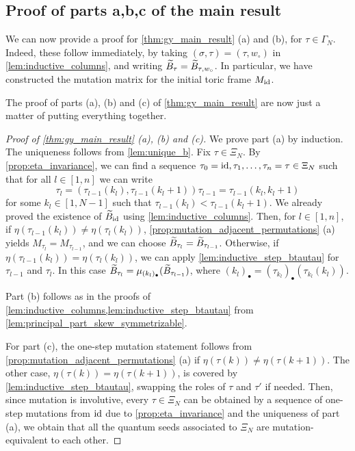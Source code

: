 \subsection{Proof of parts a,b,c of the main result}
We can now provide a proof for \cref{thm:gy_main_result} (a) and (b), for $\tau \in
	\Gamma_N$. Indeed, these follow immediately, by taking $(\sigma, \tau) = (\tau,
	w_\circ)$ in \cref{lem:inductive_columns}, and writing $\widetilde{B}_{\tau} = \widetilde{B}_{\tau,
		w_\circ}$. In particular, we have constructed the mutation matrix for the initial toric
frame $M_{\operatorname{id}}$.

The proof of parts (a), (b) and (c) of \cref{thm:gy_main_result} are now just a matter
of putting everything together.
\begin{proof}[Proof of \cref{thm:gy_main_result} (a), (b) and (c)]
	We prove part (a) by induction. The uniqueness follows from \cref{lem:unique_b}. Fix $\tau \in \Xi_N$. By \cref{prop:eta_invariance}, we can find a sequence $\tau_0 = \operatorname{id}, \tau_1, \dots, \tau_n = \tau \in \Xi_N$ such that for all $l \in [1, n]$ we can write
	\begin{equation*}
		\tau_l = (\tau_{l-1}(k_l), \tau_{l-1}(k_l + 1))\tau_{l-1} = \tau_{l-1}(k_l, k_l + 1)
	\end{equation*}
	for some $k_l \in [1, N-1]$ such that $\tau_{l-1}(k_l) < \tau_{l-1}(k_l + 1)$. We
	already proved the existence of $\widetilde{B}_{\operatorname{id}}$ using \cref{lem:inductive_columns}. Then,
	for $l \in [1, n]$, if $\eta(\tau_{l-1}(k_l)) \neq \eta(\tau_l(k_l))$,
	\cref{prop:mutation_adjacent_permutations} (a) yields $M_{\tau_l} = M_{\tau_{l-1}}$,
	and we can choose $\widetilde{B}_{\tau_l} = \widetilde{B}_{\tau_{l-1}}$. Otherwise, if
	$\eta(\tau_{l-1}(k_l)) = \eta(\tau_l(k_l))$, we can apply
	\cref{lem:inductive_step_btautau} for $\tau_{l-1}$ and $\tau_{l}$. In this case
	$\widetilde{B}_{\tau_l} = \mu_{(k_l)_\bullet}(\widetilde{B}_{\tau_{l-1}})$, where $(k_l)_\bullet =
		(\tau_{k_l})_\bullet(\tau_{k_l}(k_l))$.

	Part (b) follows as in the proofs of
	\cref{lem:inductive_columns,lem:inductive_step_btautau} from
	\cref{lem:principal_part_skew_symmetrizable}.

	For part (c), the one-step mutation statement follows from
	\cref{prop:mutation_adjacent_permutations} (a) if $\eta(\tau(k)) \neq \eta(\tau(k +
			1))$. The other case, $\eta(\tau(k)) = \eta(\tau(k+1))$, is covered by
	\cref{lem:inductive_step_btautau}, swapping the roles of $\tau$ and $\tau'$ if needed.
	Then, since mutation is involutive, every $\tau \in \Xi_N$ can be obtained by a
	sequence of one-step mutations from $\operatorname{id}$ due to \cref{prop:eta_invariance} and the
	uniqueness of part (a), we obtain that all the quantum seeds associated to $\Xi_N$ are
	mutation-equivalent to each other.
\end{proof}

